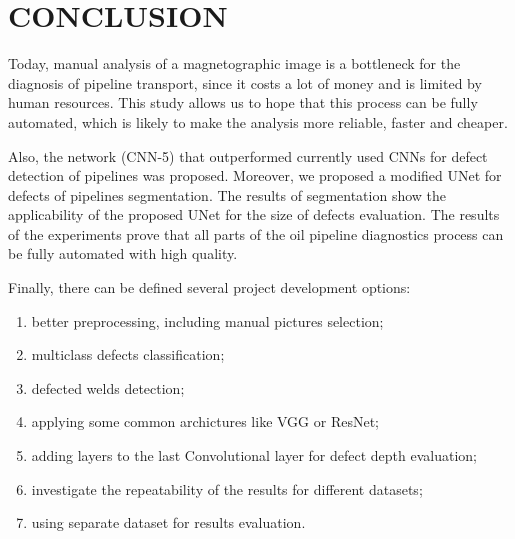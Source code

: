 \section{CONCLUSION}
\label{CONCLUSION}
Today, manual analysis of a magnetographic image is a bottleneck for the diagnosis of pipeline transport, since it costs a lot of money and is limited by human resources. This study allows us to hope that this process can be fully automated, which is likely to make the analysis more reliable, faster and cheaper.

Also, the network (CNN-5) that outperformed currently used CNNs for defect detection of pipelines was proposed. Moreover, we proposed a modified UNet for defects of pipelines segmentation. The results of segmentation show the applicability of the proposed UNet for the size of defects evaluation. The results of the experiments prove that all parts of the oil pipeline diagnostics process can be fully automated with high quality.

Finally, there can be defined several project development options:
\begin{enumerate}
	\item better preprocessing, including manual pictures selection;
	\item multiclass defects classification;
	\item defected welds detection;
	\item applying some common archictures like VGG or ResNet;
	\item adding layers to the last Convolutional layer for defect depth evaluation;
	\item investigate the repeatability of the results for different datasets;
	\item using separate dataset for results evaluation.
\end{enumerate}
